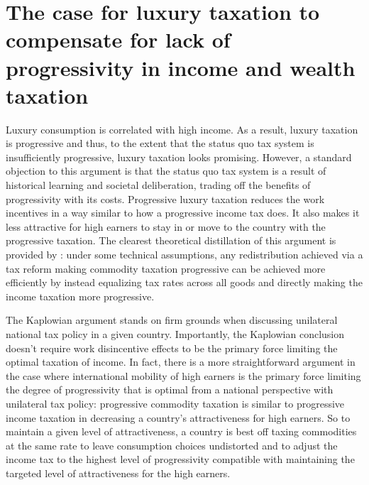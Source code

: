 \documentclass[../../main]{subfiles}
\begin{document}
\section{The case for luxury taxation to compensate for lack of progressivity in income and wealth taxation}

Luxury consumption is correlated with high income. As a result, luxury taxation is progressive and thus, to the extent that the status quo tax system is insufficiently progressive, luxury taxation looks promising. However, a standard objection to this argument is that the status quo tax system is a result of historical learning and societal deliberation, trading off the benefits of progressivity with its costs. Progressive luxury taxation reduces the work incentives in a way similar to how a progressive income tax does. It also makes it less attractive for high earners to stay in or move to the country with the progressive taxation. The clearest theoretical distillation of this argument is provided by \citet{kaplow2006undesirability}: %
under some technical assumptions, any redistribution achieved via a tax reform making commodity taxation progressive can be achieved more efficiently by instead equalizing tax rates across all goods and directly making the income taxation more progressive. 

The Kaplowian argument stands on firm grounds when discussing unilateral national tax policy in a given country. Importantly, the Kaplowian conclusion doesn't require work disincentive effects to be the primary force limiting the optimal taxation of income. In fact, there is a more straightforward argument in the case where international mobility of high earners is the primary force limiting the degree of progressivity that is optimal from a national perspective with unilateral tax policy: progressive commodity taxation is similar to progressive income taxation in decreasing a country's attractiveness for high earners. So to maintain a given level of attractiveness, a country is best off taxing commodities at the same rate to leave consumption choices undistorted and to adjust the income tax to the highest level of progressivity compatible with maintaining the targeted level of attractiveness for the high earners.
\end{document}
